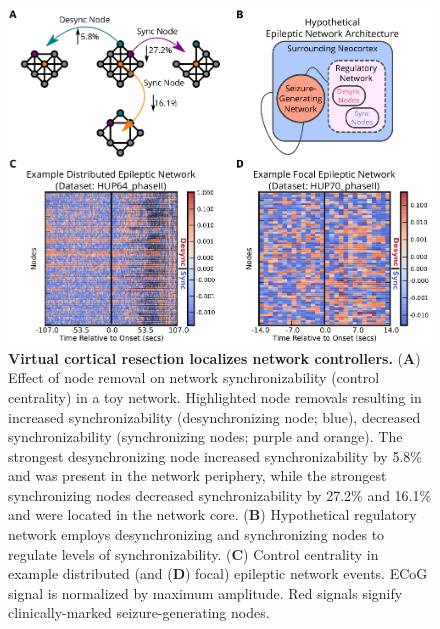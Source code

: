 \begin{figure}[H]
    \centering
    \includegraphics[width=\textwidth]{panel3.eps}
    \caption[Schematic of virtual cortical resection]{\textbf{Virtual cortical resection localizes network controllers.} (\textbf{A}) Effect of node removal on network synchronizability (control centrality) in a toy network. Highlighted node removals resulting in increased synchronizability (desynchronizing node; blue), decreased synchronizability (synchronizing nodes; purple and orange). The strongest desynchronizing node increased synchronizability by 5.8\% and was present in the network periphery, while the strongest synchronizing nodes decreased synchronizability by 27.2\% and 16.1\% and were located in the network core. (\textbf{B}) Hypothetical regulatory network employs desynchronizing and synchronizing nodes to regulate levels of synchronizability. (\textbf{C}) Control centrality in example distributed (and (\textbf{D}) focal) epileptic network events. ECoG signal is normalized by maximum amplitude. Red signals signify clinically-marked seizure-generating nodes. \label{ch5:fig3}}
\end{figure}

